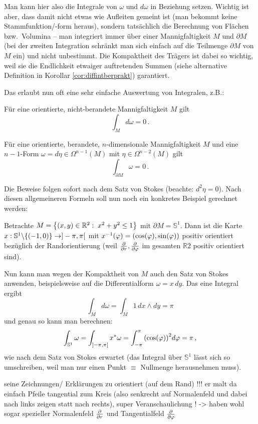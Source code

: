 \documentclass[../H_Analysis_main.tex]{subfiles}
\begin{document}
Man kann hier also die Integrale von $\omega$ und $d\omega$ in Beziehung setzen. Wichtig ist aber, dass damit nicht etwas wie Aufleiten gemeint ist (man bekommt keine Stammfunktion/-form heraus), sondern tatsächlich die Berechnung von Flächen bzw.~Volumina -- man integriert immer über einer Mannigfaltigkeit $M$ und $\partial M$ (bei der zweiten Integration schränkt man sich einfach auf die Teilmenge $\partial M$ von $M$ ein) und nicht unbestimmt. Die Kompaktheit des Trägers ist dabei so wichtig, weil sie die Endlichkeit etwaiger auftretenden Summen (siehe alternative Definition in Korollar \ref{cor:diffintberprakt}) garantiert.


Das erlaubt nun oft eine sehr einfache Auswertung von Integralen, z.B.:
\begin{cor}[Spezialfälle]
Für eine orientierte, nicht-berandete Mannigfaltigkeit $M$ gilt
\begin{equation}
\int_M d\omega = 0 \, .
\end{equation}

Für eine orientierte, berandete, $n$-dimensionale Mannigfaltigkeit $M$ und eine $n-1$-Form $\omega = d\eta \in \Omega^{n - 1}(M)$ mit $\eta \in \Omega^{n - 2}(M)$ gilt
\begin{equation}
\int_{\partial M} \omega = 0 \, .
\end{equation}
\end{cor}
Die Beweise folgen sofort nach dem Satz von Stokes (beachte: $d^2\eta = 0$). Nach diesen allgemeineren Formeln soll nun noch ein konkretes Beispiel gerechnet werden:
\begin{bsp}
Betrachte $M = \qty{(x, y) \in \mathbb{R}^2: \; x^2 + y^2 \leq 1}$ mit $\partial M = \mathbb{S}^1$. Dann ist die Karte $x: \mathbb{S}^1 \backslash \qty{(-1, 0)} \rightarrow ]-\pi, \pi[$ mit $x^{-1}(\varphi) = \qty(\cos(\varphi), \sin(\varphi))$ positiv orientiert bezüglich der Randorientierung (weil $\pdv{r}, \pdv{\varphi}$ im gesamten $\mathbb{R}2$ positiv orientiert sind).

Nun kann man wegen der Kompaktheit von $M$ auch den Satz von Stokes anwenden, beispielsweise auf die Differentialform $\omega = x \, dy$. Das eine Integral ergibt
\begin{equation}
\int_M d\omega = \int_M 1 \, dx \wedge dy = \pi
\end{equation}
und genau so kann man berechnen:
\begin{equation}
\int_{\mathbb{S}^1} \omega = \int_{]-\pi, \pi[} x^* \omega = \int_{-\pi}^\pi \qty(\cos(\varphi))^2 d\varphi = \pi \, ,
\end{equation}
wie nach dem Satz von Stokes erwartet (das Integral über $\mathbb{S}^1$ lässt sich so umschreiben, weil man nur einen Punkt $\equiv$ Nullmenge herausnehmen muss).


seine Zeichnungen/ Erklärungen zu orientiert (auf dem Rand) !!! er malt da einfach Pfeile tangential zum Kreis (also senkrecht auf Normalenfeld und dabei nach links zeigen statt nach rechts), super Veranschaulichung ! -> haben wohl sogar spezieller Normalenfeld $\pdv{r}$ und Tangentialfeld $\pdv{\varphi}$
\end{bsp}
\end{document}
